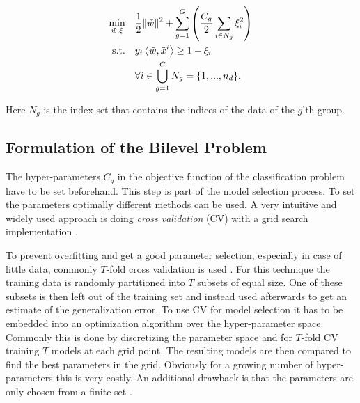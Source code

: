 \begin{align}
\begin{split}
	\min_{\tilde{w},\xi} \quad & \frac{1}{2} \|\tilde{w}\|^2+\sum_{g = 1}^G\left(\frac{C_g}{2}\sum_{i \in N_g} {\xi_i^2}\right) \vspace{0.5ex}\\
	\text{s.t.} \quad & y_i\Langle \tilde{w},\tilde{x}^i\Rangle \geq 1 - \xi_i \vspace{0.5ex}\\
	& 	\forall i \in \bigcup_{g =1}^G N_g =\{1,...,n_d\}.
\end{split}
\label{MultiSVC_QP}
\end{align}

Here \(N_g\) is the index set that contains the indices of the data of the \(g\)'th group.


\subsection{Formulation of the Bilevel Problem}


The hyper-parameters \(C_g\) in the objective function of the classification problem have to be set beforehand. This step is part of the model selection process.
To set the parameters optimally different methods can be used.
A very intuitive and widely used approach is doing \emph{cross validation} (CV) with a grid search implementation \cite[p. 30]{Kunapuli2008}.

To prevent overfitting and get a good parameter selection, especially in case of little data, commonly \(T\)-fold cross validation is used \cite[p. 30]{Kunapuli2008}.
For this technique the training data is randomly partitioned into \(T\) subsets of equal size. One of these subsets is then left out of the training set and instead used afterwards to get an estimate of the generalization error. 
To use CV for model selection it has to be embedded into an optimization algorithm over the hyper-parameter space. 
Commonly this is done by discretizing the parameter space and for \(T\)-fold CV training \(T\) models at each grid point. The resulting models are then compared to find the best parameters in the grid.
Obviously for a growing number of hyper-parameters this is very costly. An additional drawback is that the parameters are only chosen from a finite set \cite[p. 30]{Kunapuli2008}.

